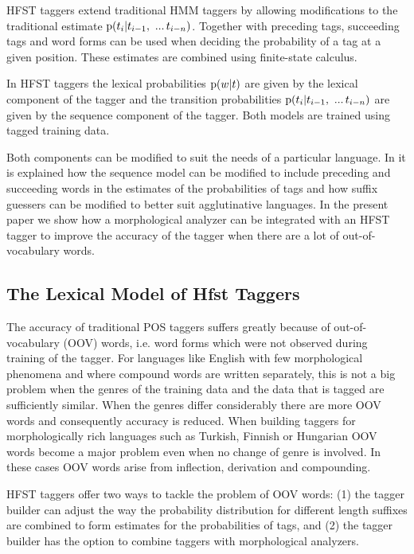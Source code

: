 \documentclass{llncs}
\begin{document}
HFST taggers extend traditional HMM taggers by allowing modifications
to the traditional estimate ${\rm p}(t_i | t_{i - 1},\ ...\,
t_{i-n})$. Together with preceding tags, succeeding tags and word
forms can be used when deciding the probability of a tag at a given
position. These estimates are combined using finite-state calculus.

In HFST taggers the lexical probabilities ${\rm p}(w|t)$ are given by
the lexical component of the tagger and the transition probabilities
${\rm p}(t_i | t_{i - 1},\ ...\, t_{i-n})$ are given by the sequence
component of the tagger. Both models are trained using tagged
training data.

Both components can be modified to suit the needs of a particular
language. In \cite{silfverberg/2011/nodalida} it is explained how the sequence
model can be modified to include preceding and succeeding words in
the estimates of the probabilities of tags and how suffix guessers
can be modified to better suit agglutinative languages. In the present paper
we show how a morphological analyzer can be integrated with an HFST
tagger to improve the accuracy of the tagger when there are a lot of
out-of-vocabulary words.


\subsection{The Lexical Model of Hfst Taggers}

The accuracy of traditional POS taggers suffers greatly
because of out-of-vocabulary (OOV) words, i.e. word forms which were
not observed during training of the tagger. For languages like
English with few morphological phenomena and where compound words are written separately, this
is not a big problem when the genres of the training data and the data
that is tagged are sufficiently similar. When the genres differ
considerably there are more OOV words and consequently accuracy
is reduced. When building taggers for morphologically rich languages
such as Turkish, Finnish or Hungarian OOV words become a major
problem even when no change of genre is involved. In these cases
OOV words arise from inflection, derivation and
compounding.

HFST taggers offer two ways to tackle the problem of OOV words: (1) the
tagger builder can adjust the way the probability distribution for
different length suffixes are combined to form estimates for the
probabilities of tags, and (2) the tagger builder has the option to combine taggers with
morphological analyzers.
\end{document}
